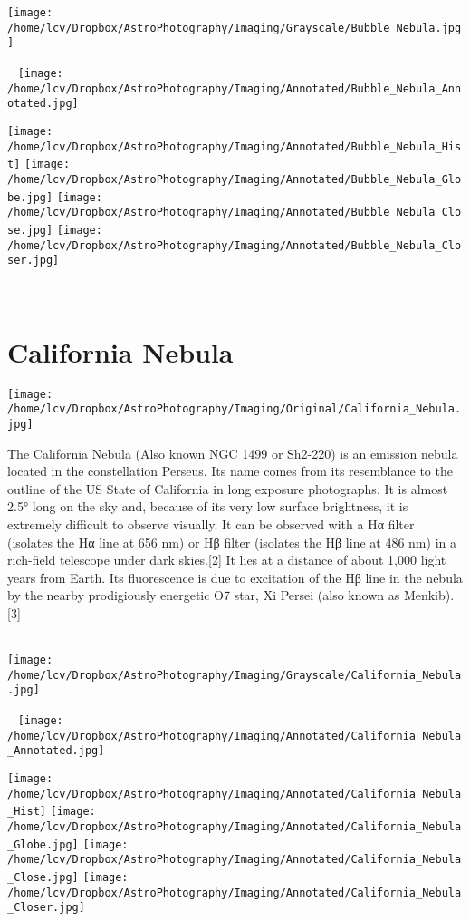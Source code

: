 \texttt{[image: /home/lcv/Dropbox/AstroPhotography/Imaging/Grayscale/Bubble\_Nebula.jpg]}
\begin{center}
 \ \newpage
\texttt{[image: /home/lcv/Dropbox/AstroPhotography/Imaging/Annotated/Bubble\_Nebula\_Annotated.jpg]}

\texttt{[image: /home/lcv/Dropbox/AstroPhotography/Imaging/Annotated/Bubble\_Nebula\_Hist]}
\texttt{[image: /home/lcv/Dropbox/AstroPhotography/Imaging/Annotated/Bubble\_Nebula\_Globe.jpg]}
\texttt{[image: /home/lcv/Dropbox/AstroPhotography/Imaging/Annotated/Bubble\_Nebula\_Close.jpg]}
\texttt{[image: /home/lcv/Dropbox/AstroPhotography/Imaging/Annotated/Bubble\_Nebula\_Closer.jpg]}
\end{center}
\ \\\section{California Nebula}
\texttt{[image: /home/lcv/Dropbox/AstroPhotography/Imaging/Original/California\_Nebula.jpg]}
{\footnotesize\color{white}
The California Nebula (Also known NGC 1499 or Sh2-220) is an emission nebula located in the constellation Perseus. Its name comes from its resemblance to the outline of the US State of California in long exposure photographs. It is almost 2.5° long on the sky and, because of its very low surface brightness, it is extremely difficult to observe visually. It can be observed with a Hα filter (isolates the Hα line at 656 nm) or Hβ filter (isolates the Hβ line at 486 nm) in a rich-field telescope under dark skies.[2] It lies at a distance of about 1,000 light years from Earth. Its fluorescence is due to excitation of the Hβ line in the nebula by the nearby prodigiously energetic O7 star, Xi Persei (also known as Menkib).[3]


}\ \\
\texttt{[image: /home/lcv/Dropbox/AstroPhotography/Imaging/Grayscale/California\_Nebula.jpg]}
\begin{center}
 \ \newpage
\texttt{[image: /home/lcv/Dropbox/AstroPhotography/Imaging/Annotated/California\_Nebula\_Annotated.jpg]}

\texttt{[image: /home/lcv/Dropbox/AstroPhotography/Imaging/Annotated/California\_Nebula\_Hist]}
\texttt{[image: /home/lcv/Dropbox/AstroPhotography/Imaging/Annotated/California\_Nebula\_Globe.jpg]}
\texttt{[image: /home/lcv/Dropbox/AstroPhotography/Imaging/Annotated/California\_Nebula\_Close.jpg]}
\texttt{[image: /home/lcv/Dropbox/AstroPhotography/Imaging/Annotated/California\_Nebula\_Closer.jpg]}
\end{center}

